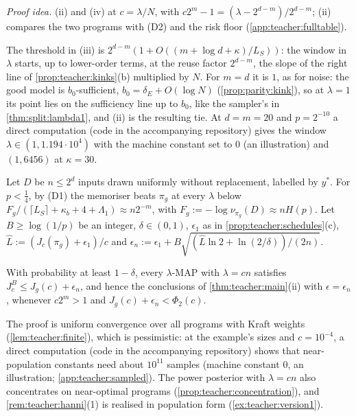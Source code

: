\emph{Proof idea.} (ii) and (iv) at $c=\lambda/N$, with $c2^m-1=(\lambda-2^{d-m})/2^{d-m}$; (ii) compares the two programs with (D2) and the risk floor (\cref{app:teacher:fulltable}).

The threshold in (iii) is $2^{d-m}(1+O((m+\log d+\kappa)/L_S))$: the window in $\lambda$ starts, up to lower-order terms, at the reuse factor $2^{d-m}$, the slope of the right line of \cref{prop:teacher:kinks}(b) multiplied by $N$. For $m=d$ it is $1$, as for noise: the good model is $b_0$-sufficient, $b_0=\delta_E+O(\log N)$ (\cref{prop:parity:kink}), so at $\lambda=1$ its point lies on the sufficiency line up to $b_0$, like the sampler's in \cref{thm:split:lambda1}, and (ii) is the resulting tie. At $d=m=20$ and $p=2^{-10}$ a direct computation (code in the accompanying repository) gives the window $\lambda\in(1,1.194\cdot10^4)$ with the machine constant set to $0$ (an illustration) and $(1,6456)$ at $\kappa=30$.

Let $D$ be $n\le2^d$ inputs drawn uniformly without replacement, labelled by $y^*$. For $p<\frac14$, by (D1) the memoriser beats $\pi_g$ at every $\lambda$ below $F_g/(\lceil L_S\rceil+\kappa_b+4+\Lambda_1)\approx n2^{-m}$, with $F_g:=-\log\nu_{\pi_g}(D)\approx nH(p)$. Let $B\ge\log(1/p)$ be an integer, $\delta\in(0,1)$, $\epsilon_1$ as in \cref{prop:teacher:schedules}(c), $\hat L:=(J_c(\pi_g)+\epsilon_1)/c$ and $\epsilon_n:=\epsilon_1+B\sqrt{(\hat L\ln2+\ln(2/\delta))/(2n)}$.

\begin{corollary}\label{cor:teacher:sampled}
With probability at least $1-\delta$, every $\lambda$-MAP with $\lambda=cn$ satisfies $J^B_c\le J_g(c)+\epsilon_n$, and hence the conclusions of \cref{thm:teacher:main}(ii) with $\epsilon=\epsilon_n$, whenever $c2^m>1$ and $J_g(c)+\epsilon_n<\Phi_2(c)$.
\end{corollary}

The proof is uniform convergence over all programs with Kraft weights (\cref{lem:teacher:finite}), which is pessimistic: at the example's sizes and $c=10^{-4}$, a direct computation (code in the accompanying repository) shows that near-population constants need about $10^{11}$ samples (machine constant $0$, an illustration; \cref{app:teacher:sampled}). The power posterior with $\lambda=cn$ also concentrates on near-optimal programs (\cref{prop:teacher:concentration}), and \cref{rem:teacher:hanni}(1) is realised in population form (\cref{ex:teacher:version1}).

